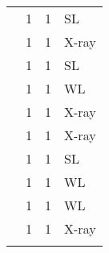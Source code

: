 \begin{center}
\begin{longtable}{|l|l|l|l|}
{\footnotesize \citet{EI13.1}} & 1 & 1 & {\small SL} \\
{\footnotesize \citet{DA01.1}} & 1 & 1 & {\small X-ray} \\
{\footnotesize \citet{CO10.1}} & 1 & 1 & {\small SL} \\
{\footnotesize \citet{CL01.2}} & 1 & 1 & {\small WL} \\
{\footnotesize \citet{BU05.1}} & 1 & 1 & {\small X-ray} \\
{\footnotesize \citet{BU04.1}} & 1 & 1 & {\small X-ray} \\
{\footnotesize \citet{BR05.2}} & 1 & 1 & {\small SL} \\
{\footnotesize \citet{BR05.1}} & 1 & 1 & {\small WL} \\
{\footnotesize \citet{BA05.1}} & 1 & 1 & {\small WL} \\
{\footnotesize \citet{AN04.1}} & 1 & 1 & {\small X-ray} \\
\label{tbl-2}
\end{longtable}
\end{center}

